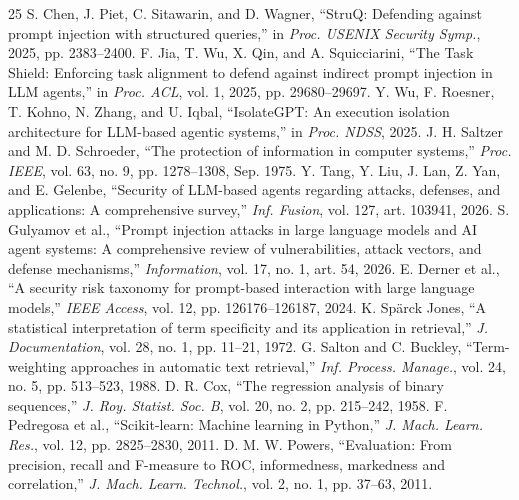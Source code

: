 \documentclass[conference]{IEEEtran}
\begin{document}
\begin{thebibliography}{25}
 S. Chen, J. Piet, C. Sitawarin, and D. Wagner, ``StruQ: Defending against prompt injection with structured queries,'' in \textit{Proc. USENIX Security Symp.}, 2025, pp. 2383--2400.
 F. Jia, T. Wu, X. Qin, and A. Squicciarini, ``The Task Shield: Enforcing task alignment to defend against indirect prompt injection in LLM agents,'' in \textit{Proc. ACL}, vol. 1, 2025, pp. 29680--29697.
 Y. Wu, F. Roesner, T. Kohno, N. Zhang, and U. Iqbal, ``IsolateGPT: An execution isolation architecture for LLM-based agentic systems,'' in \textit{Proc. NDSS}, 2025.
 J. H. Saltzer and M. D. Schroeder, ``The protection of information in computer systems,'' \textit{Proc. IEEE}, vol. 63, no. 9, pp. 1278--1308, Sep. 1975.
 Y. Tang, Y. Liu, J. Lan, Z. Yan, and E. Gelenbe, ``Security of LLM-based agents regarding attacks, defenses, and applications: A comprehensive survey,'' \textit{Inf. Fusion}, vol. 127, art. 103941, 2026.
 S. Gulyamov et al., ``Prompt injection attacks in large language models and AI agent systems: A comprehensive review of vulnerabilities, attack vectors, and defense mechanisms,'' \textit{Information}, vol. 17, no. 1, art. 54, 2026.
 E. Derner et al., ``A security risk taxonomy for prompt-based interaction with large language models,'' \textit{IEEE Access}, vol. 12, pp. 126176--126187, 2024.
 K. Sp\"{a}rck Jones, ``A statistical interpretation of term specificity and its application in retrieval,'' \textit{J. Documentation}, vol. 28, no. 1, pp. 11--21, 1972.
 G. Salton and C. Buckley, ``Term-weighting approaches in automatic text retrieval,'' \textit{Inf. Process. Manage.}, vol. 24, no. 5, pp. 513--523, 1988.
 D. R. Cox, ``The regression analysis of binary sequences,'' \textit{J. Roy. Statist. Soc. B}, vol. 20, no. 2, pp. 215--242, 1958.
 F. Pedregosa et al., ``Scikit-learn: Machine learning in Python,'' \textit{J. Mach. Learn. Res.}, vol. 12, pp. 2825--2830, 2011.
 D. M. W. Powers, ``Evaluation: From precision, recall and F-measure to ROC, informedness, markedness and correlation,'' \textit{J. Mach. Learn. Technol.}, vol. 2, no. 1, pp. 37--63, 2011.
\end{thebibliography}
\end{document}
